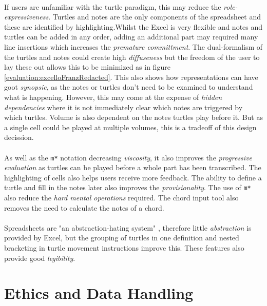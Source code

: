 \paragraph{} If users are unfamiliar with the turtle paradigm, this may reduce the \textit{role-expressiveness}. Turtles and notes are the only components of the spreadsheet and these are identified by highlighting.Whilst the Excel is very flexible and notes and turtles can be added in any order, adding an additional part may required many line insertions which increases the \textit{premature committment}. The dual-formalism of the turtles and notes could create high \textit{diffuseness} but the freedom of the user to lay these out allows this to be minimized as in figure \ref{evaluation:excelloFranzRedacted}. This also shows how representations can have goot \textit{synopsie}, as the notes or turtles don't need to be examined to understand what is happening. However, this may come at the expense of \textit{hidden dependencies} where it is not immediately clear which notes are triggered by which turtles. Volume is also dependent on the notes turtles play before it. But as a single cell could be played at multiple volumes, this is a tradeoff of this design decission.

\paragraph{} As well as the \texttt{m*} notation decreasing \textit{viscosity}, it also improves the \textit{progressive evaluation} as turtles can be played before a whole part has been transcribed. The highlighting of cells also helps users receive more feedback. The ability to define a turtle and fill in the notes later also improves the \textit{provisionality}. The use of \texttt{m*} also reduce the \textit{hard mental operations} required. The chord input tool also removes the need to calculate the notes of a chord.

\paragraph{} Spreadsheets are "an abstraction-hating system" \cite{blackwell:tutorial}, therefore little \textit{abstraction} is provided by Excel, but the grouping of turtles in one definition and nested bracketing in turtle movement instructions improve this. These features also provide good \textit{legibility}.

\section{Ethics and Data Handling}

